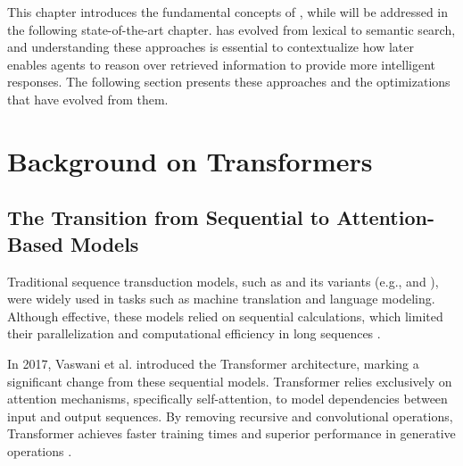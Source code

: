 \label{chap:back}

This chapter introduces the fundamental concepts of , while  will be addressed in the following state-of-the-art chapter.  has evolved from lexical to semantic search, and understanding these approaches is essential to contextualize how  later enables agents to reason over retrieved information to provide more intelligent responses. The following section presents these  approaches and the optimizations that have evolved from them.
\section{Background on Transformers} 
\label{sec:transformer}
\subsection{The Transition from Sequential to Attention-Based Models}  
Traditional sequence transduction models, such as  and its variants (e.g.,  \cite{hochreiter1997lstm} and  \cite{cho2014gru}), were widely used in tasks such as machine translation and language modeling. Although effective, these models relied on sequential calculations, which limited their parallelization and computational efficiency in long sequences \cite{vaswani2017attention}.

In 2017, Vaswani et al. introduced the Transformer architecture, marking a significant change from these sequential models. Transformer relies exclusively on attention mechanisms, specifically self-attention, to model dependencies between input and output sequences. By removing recursive and convolutional operations, Transformer achieves faster training times and superior performance in generative operations \cite{vaswani2017attention}.

